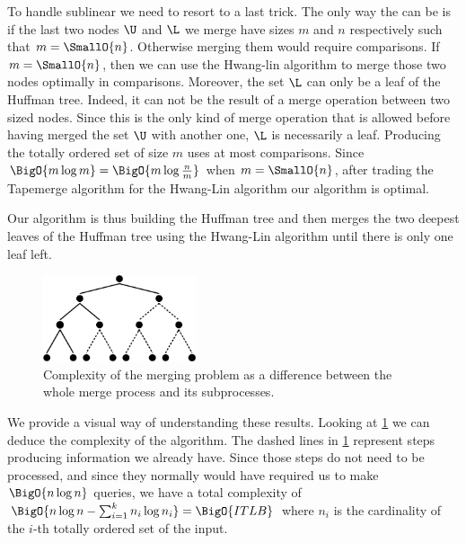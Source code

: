To handle sublinear  we need
to resort to a last trick. The only way the  can be 
is if the last two nodes \(\U\) and \(\L\) we merge have sizes \(m\) and \(n\)
respectively such that \(m =
\SmallO{n}\). Otherwise merging them would require  comparisons.
If \(m = \SmallO{n}\), then we can use the Hwang-lin algorithm to merge those
two nodes optimally in  comparisons. Moreover, the
set \(\L\) can only be a leaf of the Huffman tree. Indeed, it can
not be the result of a merge operation between two  sized nodes.
Since this is the only kind of merge operation that is allowed before having
merged the set \(\U\) with another one, \(\L\) is necessarily a leaf.
Producing the totally ordered set of size \(m\) uses at most 
comparisons. Since \(\BigO{m \log m} = \BigO{m \log \frac{n}{m}}\) when \(m =
\SmallO{n}\), after trading the Tapemerge algorithm for the Hwang-Lin
algorithm our algorithm is optimal.

Our algorithm is thus building the Huffman tree and then merges the two deepest
leaves of the Huffman tree using the Hwang-Lin algorithm until there is only
one leaf left.

\begin{figure}
	\centering
	\includegraphics[width=0.4\textwidth]{fig/merging/huffman-2-trim}
	\caption{Complexity of the merging problem as a difference between the whole merge process and its subprocesses.}
	\label{tree:merging:fig/huffman-2}
\end{figure}

We provide a visual way of understanding these results. Looking at
\ref{tree:merging:fig/huffman-2} we can deduce the complexity of the algorithm.
The dashed lines in \ref{tree:merging:fig/huffman-2} represent steps producing
information we already have. Since those steps do not need to be processed, and
since they normally would have required us to make \(\BigO{n \log n}\) queries, we have a
total complexity of $\BigO{n \log n - \sum_{i=1}^{k} n_i \log n_i} =
\BigO{ITLB}$ where $n_i$ is the cardinality of the $i$-th totally ordered set
of the input.
